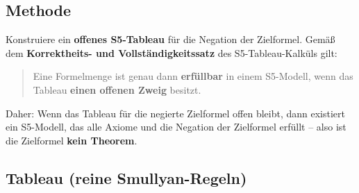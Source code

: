 \documentclass[
]{article}
\begin{document}
\subsection{Methode}

Konstruiere ein \textbf{offenes S5-Tableau} für die Negation der Zielformel.  
Gemäß dem \textbf{Korrektheits- und Vollständigkeitssatz} des S5-Tableau-Kalküls gilt:

\begin{quote}
Eine Formelmenge ist genau dann \textbf{erfüllbar} in einem S5-Modell, wenn das Tableau \textbf{einen offenen Zweig} besitzt.
\end{quote}

Daher: Wenn das Tableau für die negierte Zielformel offen bleibt, dann existiert ein S5-Modell, das alle Axiome und die Negation der Zielformel erfüllt – also ist die Zielformel \textbf{kein Theorem}.

\subsection{Tableau (reine Smullyan-Regeln)}
\end{document}
